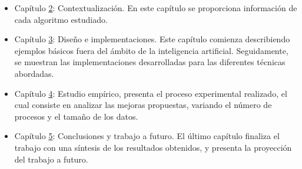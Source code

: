 	
	\begin{itemize}
		\item Capítulo \hyperref[cap:c2_context]{2}: Contextualización. En este capítulo se proporciona información de cada algoritmo estudiado.
		\item Capítulo \hyperref[cap:c3_implementaciones]{3}: Diseño e implementaciones. Este capítulo comienza describiendo ejemplos básicos fuera del ámbito de la inteligencia artificial. Seguidamente, se muestran las implementaciones desarrolladas para las diferentes técnicas abordadas.
		\item Capítulo \hyperref[cap:c4_estudio]{4}: Estudio empírico, presenta el proceso experimental realizado, el cual consiste en analizar las mejoras propuestas, variando el número de procesos y el tamaño de los datos. 
		\item Capítulo \hyperref[cap:c5_conclu]{5}: Conclusiones y trabajo a futuro. El último capítulo finaliza el trabajo con una síntesis  de los resultados obtenidos, y presenta la proyección del trabajo a futuro.
	\end{itemize}
















